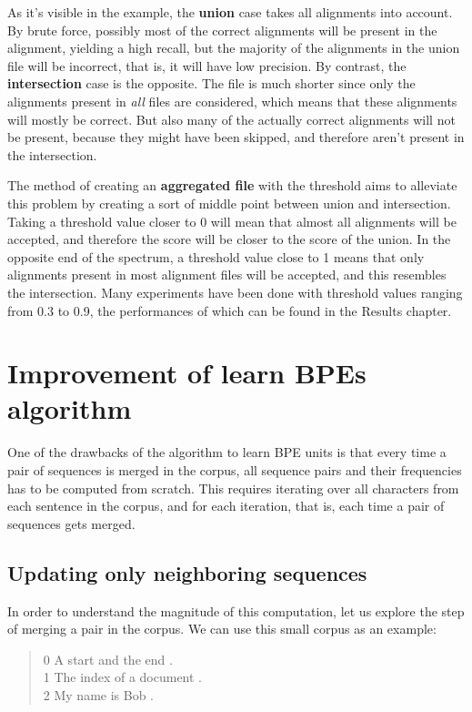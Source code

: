 As it's visible in the example, the \textbf{union} case takes all alignments into account. By brute force, possibly most of the correct alignments will be present in the alignment, yielding a high recall, but the majority of the alignments in the union file will be incorrect, that is, it will have low precision. By contrast, the \textbf{intersection} case is the opposite. The file is much shorter since only the alignments present in \emph{all} files are considered, which means that these alignments will mostly be correct. But also many of the actually correct alignments will not be present, because they might have been skipped, and therefore aren't present in the intersection. 

The method of creating an \textbf{aggregated file} with the threshold aims to alleviate this problem by creating a sort of middle point between union and intersection. Taking a threshold value closer to 0 will mean that almost all alignments will be accepted, and therefore the score will be closer to the score of the union. In the opposite end of the spectrum, a threshold value close to 1 means that only alignments present in most alignment files will be accepted, and this resembles the intersection. Many experiments have been done with threshold values ranging from 0.3 to 0.9, the performances of which can be found in the Results chapter.

\section{Improvement of learn BPEs algorithm}\label{sec:improvlearnbpe}

One of the drawbacks of the algorithm to learn BPE units is that every time a pair of sequences is merged in the corpus, all sequence pairs and their frequencies has to be computed from scratch. This requires iterating over all characters from each sentence in the corpus, and for each iteration, that is, each time a pair of sequences gets merged.

\subsection{Updating only neighboring sequences}

In order to understand the magnitude of this computation, let us explore the step of merging a pair in the corpus. We can use this small corpus as an example:

\begin{quote}
	0	A start and the end .\\
	1 	The index of a document .\\
	2 	My name is Bob .
\end{quote}

